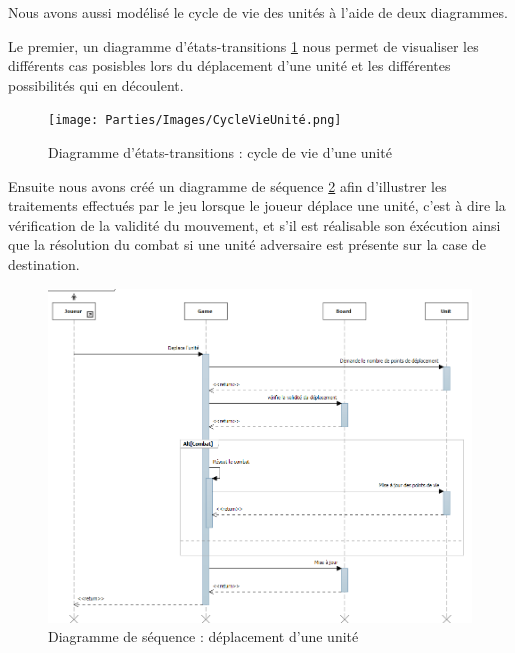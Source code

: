 Nous avons aussi modélisé le cycle de vie des unités à l'aide de deux diagrammes.

Le premier, un diagramme d'états-transitions \ref{fig:CycleVieUnité} nous permet de visualiser les différents cas posisbles lors du déplacement d'une unité et les différentes possibilités qui en découlent.
\begin{figure}[!h]
\centering
\texttt{[image: Parties/Images/CycleVieUnité.png]}
\caption{Diagramme d'états-transitions : cycle de vie d'une unité}
\label{fig:CycleVieUnité}
\end{figure}

\bigbreak
Ensuite nous avons créé un diagramme de séquence \ref{fig:seq_DeplacementUnite} afin d'illustrer les traitements effectués par le jeu lorsque le joueur déplace une unité, c'est à dire la vérification de la validité du mouvement, et s'il est réalisable son éxécution ainsi que la résolution du combat si une unité adversaire est présente sur la case de destination.
\begin{figure}[!h]
\centering
\includegraphics[width=\textwidth]{Parties/Images/seq_DeplacementUnite.png}
\caption{Diagramme de séquence : déplacement d'une unité}
\label{fig:seq_DeplacementUnite}
\end{figure}
